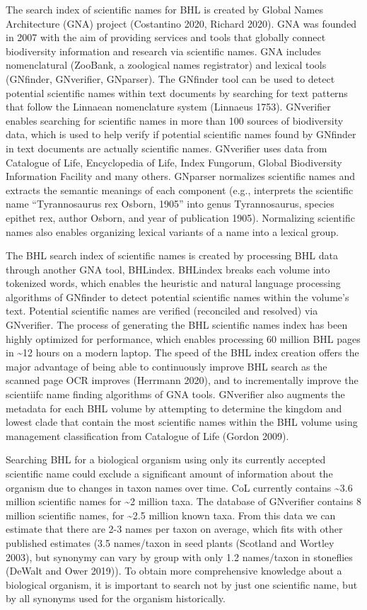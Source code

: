 \documentclass[
]{article}
\begin{document}
The search index of scientific names for BHL is created by Global Names
Architecture (GNA) project (Costantino 2020, Richard 2020). GNA was
founded in 2007 with the aim of providing services and tools that
globally connect biodiversity information and research via scientific
names. GNA includes nomenclatural (ZooBank, a zoological names
registrator) and lexical tools (GNfinder, GNverifier, GNparser). The
GNfinder tool can be used to detect potential scientific names within
text documents by searching for text patterns that follow the Linnaean
nomenclature system (Linnaeus 1753). GNverifier enables searching for
scientific names in more than 100 sources of biodiversity data, which is
used to help verify if potential scientific names found by GNfinder in
text documents are actually scientific names. GNverifier uses data from
Catalogue of Life, Encyclopedia of Life, Index Fungorum, Global
Biodiversity Information Facility and many others. GNparser normalizes
scientific names and extracts the semantic meanings of each component
(e.g., interprets the scientific name ``Tyrannosaurus rex Osborn, 1905''
into genus Tyrannosaurus, species epithet rex, author Osborn, and year
of publication 1905). Normalizing scientific names also enables
organizing lexical variants of a name into a lexical group.

The BHL search index of scientific names is created by processing BHL
data through another GNA tool, BHLindex. BHLindex breaks each volume
into tokenized words, which enables the heuristic and natural language
processing algorithms of GNfinder to detect potential scientific names
within the volume's text. Potential scientific names are verified
(reconciled and resolved) via GNverifier. The process of generating the
BHL scientific names index has been highly optimized for performance,
which enables processing 60 million BHL pages in \textasciitilde12 hours
on a modern laptop. The speed of the BHL index creation offers the major
advantage of being able to continuously improve BHL search as the
scanned page OCR improves (Herrmann 2020), and to incrementally improve
the scientiifc name finding algorithms of GNA tools. GNverifier also
augments the metadata for each BHL volume by attempting to determine the
kingdom and lowest clade that contain the most scientific names within
the BHL volume using management classification from Catalogue of Life
(Gordon 2009).

Searching BHL for a biological organism using only its currently
accepted scientific name could exclude a significant amount of
information about the organism due to changes in taxon names over time.
CoL currently contains \textasciitilde3.6 million scientific names for
\textasciitilde2 million taxa. The database of GNverifier contains 8
million scientific names, for \textasciitilde2.5 million known taxa.
From this data we can estimate that there are 2-3 names per taxon on
average, which fits with other published estimates (3.5 names/taxon in
seed plants (Scotland and Wortley 2003), but synonymy can vary by group
with only 1.2 names/taxon in stoneflies (DeWalt and Ower 2019)). To
obtain more comprehensive knowledge about a biological organism, it is
important to search not by just one scientific name, but by all synonyms
used for the organism historically.
\end{document}
